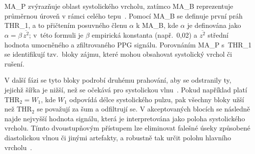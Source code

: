 
\acs{MA_P} zvýrazňuje oblast systolického vrcholu, zatímco \acs{MA_B} reprezentuje průměrnou úroveň v rámci celého tepu~\cite{Elgendi2013}.
Pomocí \acs{MA_B} se definuje první práh \acs{THR_1}, a to přičtením posuvného členu $\alpha$ k \acs{MA_B}, kde $\alpha$ je definována jako $\alpha = \beta\,\overline{z^2}$; v~této formuli je $\beta$ empirická konstanta (např.\ 0,02) a $\overline{z^2}$ střední hodnota umocněného a zfiltrovaného PPG signálu.
Porovnáním \acs{MA_P} s~\acs{THR_1} se identifikují tzv.\ bloky zájmu, které mohou obsahovat systolický vrchol či rušení.

V další fázi se tyto bloky podrobí druhému prahování, aby se odstranily ty, jejichž šířka je nižší, než se očekává pro systolickou vlnu~\cite{Elgendi2013}.
Pokud například platí $\mathrm{THR}_2 = W_1$, kde $W_1$ odpovídá délce systolického pulzu, pak všechny bloky užší než $\mathrm{THR}_2$ se považují za šum a odfiltrují se.
V akceptovaných blocích se následně najde nejvyšší hodnota signálu, která je interpretována jako poloha systolického vrcholu.
Tímto dvoustupňovým přístupem lze eliminovat falešné úseky způsobené diastolickou vlnou či jinými artefakty, a robustně tak určit polohu hlavního vrcholu~\cite{Elgendi2013}.




